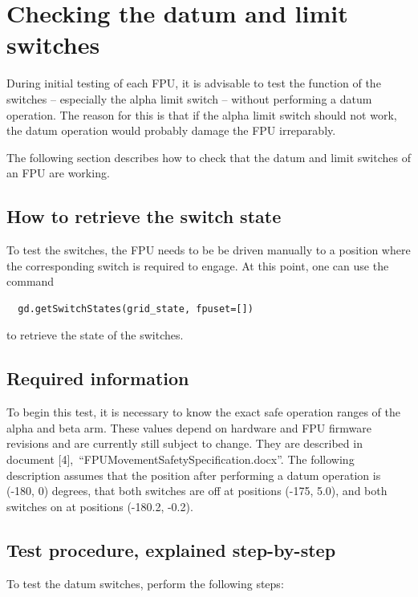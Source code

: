 \documentclass[fontsize=12,a4paper]{scrreprt}
\begin{document}
\chapter{Checking the datum and limit switches}
\label{sec:datumswitchcheck}

During initial testing of each FPU, it is advisable to test the
function of the switches -- especially the alpha limit switch --
without performing a datum operation. The reason for this is that if
the alpha limit switch should not work, the datum operation would
probably damage the FPU irreparably.

The following section describes how to check that the datum and limit
switches of an FPU are working.

\section{How to retrieve the switch state}


To test the switches, the FPU needs to be be driven manually to a
position where the corresponding switch is required to engage. At this
point, one can use the command

\begin{verbatim}
  gd.getSwitchStates(grid_state, fpuset=[])
\end{verbatim}

to retrieve the state of the switches.


\section{Required information}

To begin this test, it is necessary to know the exact safe operation
ranges of the alpha and beta arm. These values depend on hardware and
FPU firmware revisions and are currently still subject to change.
They are described in document
[4],~``FPUMovementSafetySpecification.docx''.  The following
description assumes that the position after performing a datum
operation is (-180\degree, 0\degree) degrees, that both switches are off at
positions (-175\degree, 5.0\degree), and both switches on at positions (-180.2\degree,
-0.2\degree).

\section{Test procedure, explained step-by-step}
To test the datum switches, perform the following steps:
\end{document}
